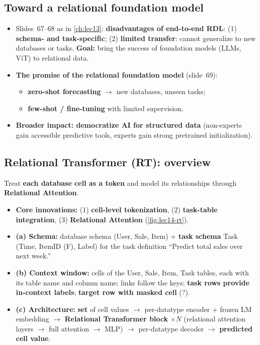 \subsection{Toward a relational foundation model}\label{sec:lec14-rfm}

\begin{itemize}
  \item Slides~67--68 as in \cref{ch:lec13}: \textbf{disadvantages of end-to-end RDL}:
    (1) \textbf{schema- and task-specific}; (2) \textbf{limited transfer}: cannot
    generalize to new databases or tasks. \textbf{Goal:} bring the success of foundation
    models (LLMs, ViT) to relational data.
  \item \textbf{The promise of the relational foundation model} (slide~69):
    \begin{itemize}
      \item \textbf{zero-shot forecasting} $\to$ new databases, unseen tasks;
      \item \textbf{few-shot / fine-tuning} with limited supervision.
    \end{itemize}
  \item \textbf{Broader impact: democratize AI for structured data} (non-experts gain
    accessible predictive tools, experts gain strong pretrained initialization).
\end{itemize}

\subsection{Relational Transformer (RT): overview}\label{sec:lec14-rt-ov}

\begin{keyidea}
  Treat \textbf{each database cell as a token} and model its relationships through
  \textbf{Relational Attention}.
\end{keyidea}
\begin{itemize}
  \item \textbf{Core innovations:} (1) \textbf{cell-level tokenization}, (2)
    \textbf{task-table integration}, (3) \textbf{Relational Attention}
    (\cref{fig:lec14-rt}).
  \item \textbf{(a) Schema:} database schema (User, Sale, Item) + \textbf{task schema} Task
    (Time, ItemID (F), Label) for the task definition ``Predict total sales over next
    week.''
  \item \textbf{(b) Context window:} cells of the User, Sale, Item, Task tables, each with
    its table name and column name; links follow the keys; \textbf{task rows provide
    in-context labels}; \textbf{target row with masked cell} (?).
  \item \textbf{(c) Architecture:} \textbf{set} of cell values $\to$ per-datatype encoder
    + frozen LM embedding $\to$ \textbf{Relational Transformer block} $\times N$
    (relational attention layers $\to$ full attention $\to$ MLP) $\to$ per-datatype decoder
    $\to$ \textbf{predicted cell value}.
\end{itemize}

